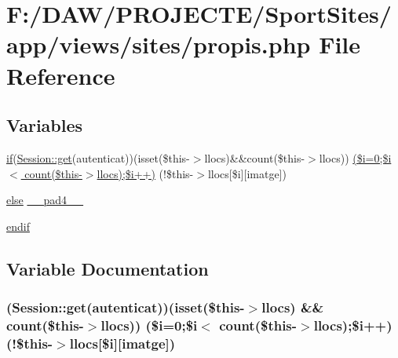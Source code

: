 \hypertarget{propis_8php}{}\section{F\+:/\+D\+A\+W/\+P\+R\+O\+J\+E\+C\+T\+E/\+Sport\+Sites/app/views/sites/propis.php File Reference}
\label{propis_8php}
\subsection*{Variables}
\begin{DoxyCompactItemize}
\item 
\hyperlink{app_2views_2index_2index_8php_af71ebd4d252438a1590e85e150ce8954}{if}(\hyperlink{class_session_acf4e501ef0dfb6e98762fbecc9d75b9a}{Session\+::get}(\textquotesingle{}autenticat\textquotesingle{}))(isset(\$this-\/$>$llocs)\&\&count(\$this-\/$>$llocs)) \hyperlink{propis_8php_a48ba74bce45612975fa340b1bb761e7d}{(\$i=0;\$i$<$ count(\$this-\/$>$llocs);\$i++)} (!\$this-\/$>$llocs\mbox{[}\$i\mbox{]}\mbox{[}\textquotesingle{}imatge\textquotesingle{}\mbox{]})
\item 
\hyperlink{header_8php_ae69d798cba64778886b1a564b11f2793}{else} \hyperlink{propis_8php_a4b953ca50a29aec287fd26dcb69696db}{\+\_\+\+\_\+pad4\+\_\+\+\_\+}
\item 
\hyperlink{propis_8php_a82cd33ca97ff99f2fcc5e9c81d65251b}{endif}
\end{DoxyCompactItemize}


\subsection{Variable Documentation}
\hypertarget{propis_8php_a48ba74bce45612975fa340b1bb761e7d}{}
\subsubsection[{(\$i=0;\$i$<$ count(\$this-\/$>$llocs);\$i++)}]{({\bf Session\+::get}(\textquotesingle{}autenticat\textquotesingle{}))(isset(\$this-\/$>$llocs) \&\& count(\$this-\/$>$llocs)) (\$i=0;\$i$<$ count(\$this-\/$>$llocs);\$i++)(!\$this-\/$>$llocs\mbox{[}\$i\mbox{]}\mbox{[}\textquotesingle{}imatge\textquotesingle{}\mbox{]})}\label{propis_8php_a48ba74bce45612975fa340b1bb761e7d}
\hypertarget{propis_8php_a4b953ca50a29aec287fd26dcb69696db}{}
